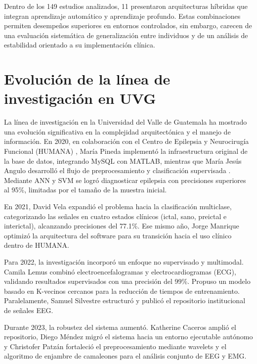 Dentro de los 149 estudios analizados, 11 presentaron arquitecturas híbridas que integran aprendizaje automático y aprendizaje profundo. Estas combinaciones permiten desempeños superiores en entornos controlados, sin embargo, carecen de una evaluación sistemática de generalización entre individuos y de un análisis de estabilidad orientado a su implementación clínica.


\section{Evolución de la línea de investigación en UVG}
La línea de investigación en la Universidad del Valle de Guatemala ha mostrado una evolución significativa en la complejidad arquitectónica y el manejo de información. En 2020, en colaboración con el Centro de Epilepsia y Neurocirugía Funcional (HUMANA) \cite{HUMANA}, María Pineda \cite{Pineda_2020} implementó la infraestructura original de la base de datos, integrando MySQL con MATLAB, mientras que María Jesús Angulo desarrolló el flujo de preprocesamiento y clasificación supervisada \cite{Angulo_2020}. Mediante ANN y SVM se logró diagnosticar epilepsia con precisiones superiores al 95\%, limitadas por el tamaño de la muestra inicial.

En 2021, David Vela \cite{Vela_2021} expandió el problema hacia la clasificación multiclase, categorizando las señales en cuatro estados clínicos (ictal, sano, preictal e interictal), alcanzando precisiones del 77.1\%. Ese mismo año, Jorge Manrique \cite{Manrique_2021} optimizó la arquitectura del software para su transición hacia el uso clínico dentro de HUMANA.

Para 2022, la investigación incorporó un enfoque no supervisado y multimodal. Camila Lemus \cite{Lemus_2022} combinó electroencefalogramas y electrocardiogramas (ECG), validando resultados supervisados con una precisión del 99\%. Propuso un modelo basado en K-vecinos cercanos para la reducción de tiempos de entrenamiento. Paralelamente, Samuel Silvestre \cite{Silvestre_2022} estructuró y publicó el repositorio institucional de señales EEG.

Durante 2023, la robustez del sistema aumentó. Katherine Caceros \cite{Caceros_2023} amplió el repositorio, Diego Méndez \cite{Mendez_2023} migró el sistema hacia un entorno ejecutable autónomo y Christofer Patzán \cite{Patzan_2023} fortaleció el preprocesamiento mediante wavelets y el algoritmo de enjambre de camaleones para el análisis conjunto de EEG y EMG.

